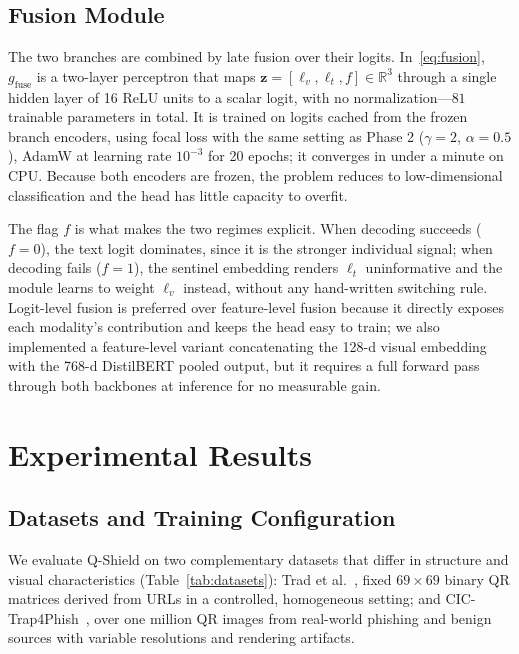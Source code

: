 \documentclass[conference]{IEEEtran}
\begin{document}
\subsection{Fusion Module}
\label{sec:fusion}

The two branches are combined by late fusion over their logits. In~\eqref{eq:fusion}, $g_{\text{fuse}}$ is a two-layer perceptron that maps $\mathbf{z} = [\ell_v, \ell_t, f] \in \mathbb{R}^{3}$ through a single hidden layer of 16 ReLU units to a scalar logit, with no normalization---$81$ trainable parameters in total. It is trained on logits cached from the frozen branch encoders, using focal loss with the same setting as Phase 2 ($\gamma=2$, $\alpha=0.5$), AdamW at learning rate $10^{-3}$ for 20 epochs; it converges in under a minute on CPU. Because both encoders are frozen, the problem reduces to low-dimensional classification and the head has little capacity to overfit.

The flag $f$ is what makes the two regimes explicit. When decoding succeeds ($f=0$), the text logit dominates, since it is the stronger individual signal; when decoding fails ($f=1$), the sentinel embedding renders $\ell_t$ uninformative and the module learns to weight $\ell_v$ instead, without any hand-written switching rule. Logit-level fusion is preferred over feature-level fusion because it directly exposes each modality's contribution and keeps the head easy to train; we also implemented a feature-level variant concatenating the 128-d visual embedding with the 768-d DistilBERT pooled output, but it requires a full forward pass through both backbones at inference for no measurable gain.

\section{Experimental Results}
\label{sec:results}

\subsection{Datasets and Training Configuration}

We evaluate Q-Shield on two complementary datasets that differ in structure and visual characteristics (Table~\ref{tab:datasets}): Trad et al.~\cite{trad2025detecting}, fixed $69 \times 69$ binary QR matrices derived from URLs in a controlled, homogeneous setting; and CIC-Trap4Phish~\cite{nejati2026cic}, over one million QR images from real-world phishing and benign sources with variable resolutions and rendering artifacts.
\end{document}
